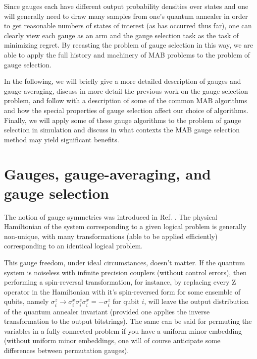 Since gauges each have different output probability densities over states and one will generally need to draw many samples from one's quantum annealer in order to get reasonable numbers of states of interest (as has occurred thus far), one can clearly view each gauge as an arm and the gauge selection task as the task of minimizing regret. By recasting the problem of gauge selection in this way, we are able to apply the full history and machinery of MAB problems to the problem of gauge selection.

In the following, we will briefly give a more detailed description of gauges and gauge-averaging, discuss in more detail the previous work on the gauge selection problem, and follow with a description of some of the common MAB algorithms and how the special properties of gauge selection affect our choice of algorithms. Finally, we will apply some of these gauge algorithms to the problem of gauge selection in simulation and discuss in what contexts the MAB gauge selection method may yield significant benefits.

\section{Gauges, gauge-averaging, and gauge selection}

The notion of gauge symmetries was introduced in Ref. \cite{q108}. The physical Hamiltonian of the system corresponding to a given logical problem is generally non-unique, with many transformations (able to be applied efficiently) corresponding to an identical logical problem. 

This gauge freedom, under ideal circumstances, doesn't matter. If the quantum system is noiseless with infinite precision couplers (without control errors), then performing a spin-reversal transformation, for instance, by replacing every Z operator in the Hamiltonian with it's spin-reversed form for some ensemble of qubits, namely $\sigma_i^z\rightarrow \sigma_i^x\sigma_i^z\sigma_i^x = -\sigma_i^z$ for qubit $i$, will leave the output distribution of the quantum annealer invariant (provided one applies the inverse transformation to the output bitstrings). The same can be said for permuting the variables in a fully connected problem if you have a uniform minor embedding \cite{Venturelli:2015pi} (without uniform minor embeddings, one will of course anticipate some differences between permutation gauges). 

